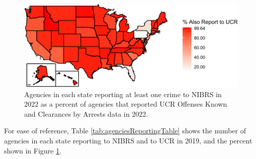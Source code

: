 \documentclass[
  12pt,
  openany]{book}
\begin{document}
\begin{figure}

{\centering \includegraphics[width=0.9\linewidth]{11_nibrs_general_files/figure-latex/agenciesReportingMapPercent-1} 

}

\caption{Agencies in each state reporting at least one crime to NIBRS in 2022 as a percent of agencies that reported UCR Offenses Known and Clearances by Arrests data in 2022.}\label{fig:agenciesReportingMapPercent}
\end{figure}

For ease of reference, Table \ref{tab:agenciesReportingTable} shows the number of agencies in each state reporting to NIBRS and to UCR in 2019, and the percent shown in Figure \ref{fig:agenciesReportingMapPercent}.
\end{document}
